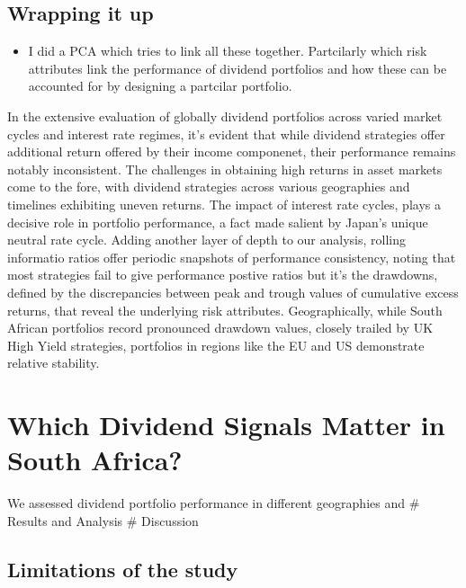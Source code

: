 \documentclass[11pt,preprint, authoryear]{elsarticle}
\numberwithin{equation}{section}
\numberwithin{figure}{section}
\numberwithin{table}{section}
\def\tightlist{} %
\begin{document}
\hypertarget{wrapping-it-up}{%
\subsection{Wrapping it up}\label{wrapping-it-up}}

\begin{itemize}
\tightlist
\item
  I did a PCA which tries to link all these together. Partcilarly which
  risk attributes link the performance of dividend portfolios and how
  these can be accounted for by designing a partcilar portfolio.
\end{itemize}

In the extensive evaluation of globally dividend portfolios across
varied market cycles and interest rate regimes, it's evident that while
dividend strategies offer additional return offered by their income
componenet, their performance remains notably inconsistent. The
challenges in obtaining high returns in asset markets come to the fore,
with dividend strategies across various geographies and timelines
exhibiting uneven returns. The impact of interest rate cycles, plays a
decisive role in portfolio performance, a fact made salient by Japan's
unique neutral rate cycle. Adding another layer of depth to our
analysis, rolling informatio ratios offer periodic snapshots of
performance consistency, noting that most strategies fail to give
performance postive ratios but it's the drawdowns, defined by the
discrepancies between peak and trough values of cumulative excess
returns, that reveal the underlying risk attributes. Geographically,
while South African portfolios record pronounced drawdown values,
closely trailed by UK High Yield strategies, portfolios in regions like
the EU and US demonstrate relative stability.

\hypertarget{which-dividend-signals-matter-in-south-africa}{%
\section{Which Dividend Signals Matter in South
Africa?}\label{which-dividend-signals-matter-in-south-africa}}

We assessed dividend portfolio performance in different geographies and
\# Results and Analysis \# Discussion

\hypertarget{limitations-of-the-study}{%
\subsection{Limitations of the study}\label{limitations-of-the-study}}
\end{document}
